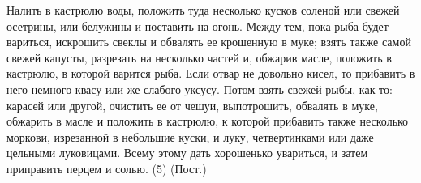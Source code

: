 Налить в кастрюлю воды, положить туда несколько кусков соленой или свежей осетрины, или белужины и поставить на огонь. Между тем, пока рыба будет вариться, искрошить свеклы и обвалять ее крошенную в муке; взять также самой свежей капусты, разрезать на несколько частей и, обжарив масле, положить в кастрюлю, в которой варится рыба. Если отвар не довольно кисел, то прибавить в него немного квасу или же слабого уксусу. Потом взять свежей рыбы, как то: карасей или другой, очистить ее от чешуи, выпотрошить, обвалять в муке, обжарить в масле и положить в кастрюлю, к которой прибавить также несколько моркови, изрезанной в небольшие куски, и луку, четвертинками или даже цельными луковицами. Всему этому дать хорошенько увариться, и затем приправить перцем и солью. (5) (Пост.)
